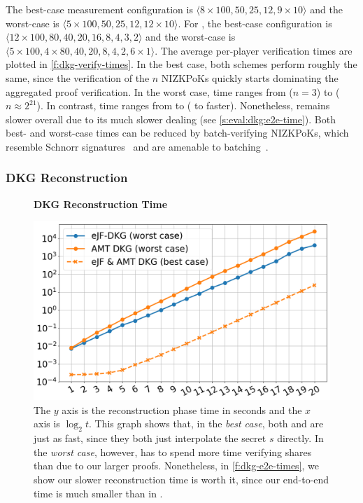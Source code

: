 The best-case \ejfdkg measurement configuration is $\langle 8 \times 100, 50, 25, 12, 9 \times 10\rangle$ and the worst-case is $\langle 5 \times 100, 50, 25, 12, 12\times 10 \rangle$.
For \ourdkg, the best-case configuration is $\langle 12\times 100, 80, 40, 20, 16, 8, 4, 3, 2 \rangle$ and the worst-case is $\langle 5 \times 100, 4\times 80, 40, 20, 8, 4, 2, 6\times 1 \rangle$.
The average per-player verification times are plotted in \cref{f:dkg-verify-times}.
In the best case, both schemes perform roughly the same, since the verification of the $n$ NIZKPoKs quickly starts dominating the aggregated proof verification.
In the worst case, \ourdkg time ranges from  ($n=3$) to  ($n \approx 2^{21}$).
In contrast, \ejfdkg time ranges from  to  ( to  faster).
Nonetheless, \ejfdkg remains slower overall due to its much slower dealing (see \cref{s:eval:dkg:e2e-time}).
Both best- and worst-case times can be reduced by batch-verifying NIZKPoKs, which resemble Schnorr signatures~\cite{Schnorr89} and are amenable to batching~\cite{BDL+12}.

\subsubsection{DKG Reconstruction}
\label{s:eval:dkg:reconstr}

\begin{figure}[t]
    \centering
    \textbf{DKG Reconstruction Time}\par\medskip
    \includegraphics[width=0.70\columnwidth]{figures-thresh/dkg-reconstr-times.png}
    \caption{
        The $y$ axis is the reconstruction phase time in seconds and the $x$ axis is $\log_2{t}$.
        This graph shows that, in the \textit{best case}, both \ourdkg and \ejfdkg are just as fast, since they both just interpolate the secret $s$ directly.
        In the \textit{worst case}, however, \ourdkg has to spend more time verifying shares than \ejfdkg due to our larger proofs.
        Nonetheless, in \cref{f:dkg-e2e-times}, we show our slower reconstruction time is worth it, since our end-to-end time is much smaller than in \ejfdkg.
    }
    \label{f:dkg-reconstr-times}
\end{figure}

